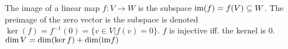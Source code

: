  The image of a linear map $f : V \to W$ is the subspace $\text{im}(f) = f(V) \subseteq W$. The preimage of the zero vector is the subspace is denoted $\ker(f) = f^{-1}(0) = \{v \in V | f(v)=0\}$.
 $f$ is injective iff. the kernel is 0.
 $\dim V = \dim(\ker f) + \dim(\text{im} f)$
